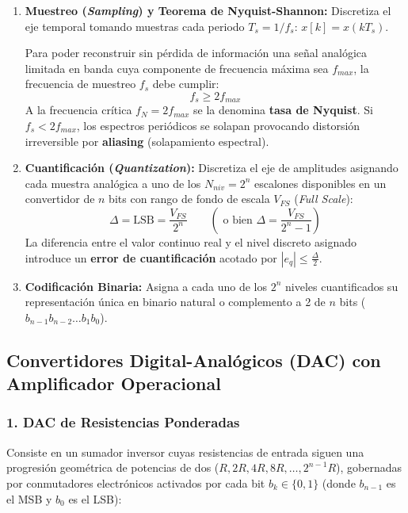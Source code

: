 \begin{enumerate}[leftmargin=*]
    \item \textbf{Muestreo (\textit{Sampling}) y Teorema de Nyquist-Shannon:}
    Discretiza el eje temporal tomando muestras cada periodo $T_s = 1/f_s$: $x[k] = x(k T_s)$.
    \begin{ley}
    Para poder reconstruir sin pérdida de información una señal analógica limitada en banda cuya componente de frecuencia máxima sea $f_{max}$, la frecuencia de muestreo $f_s$ debe cumplir:
    \begin{equation}
        \boxed{f_s \ge 2 f_{max}}
    \end{equation}
    A la frecuencia crítica $f_N = 2 f_{max}$ se la denomina \textbf{tasa de Nyquist}. Si $f_s < 2 f_{max}$, los espectros periódicos se solapan provocando distorsión irreversible por \textbf{aliasing} (solapamiento espectral).
    \end{ley}
    \item \textbf{Cuantificación (\textit{Quantization}):}
    Discretiza el eje de amplitudes asignando cada muestra analógica a uno de los $N_{niv} = 2^n$ escalones disponibles en un convertidor de $n$ bits con rango de fondo de escala $V_{FS}$ (\textit{Full Scale}):
    \begin{equation}
        \boxed{\Delta = \text{LSB} = \frac{V_{FS}}{2^n}} \qquad \left(\text{ o bien } \Delta = \frac{V_{FS}}{2^n - 1}\right)
    \end{equation}
    La diferencia entre el valor continuo real y el nivel discreto asignado introduce un \textbf{error de cuantificación} acotado por $|e_q| \le \frac{\Delta}{2}$.
    \item \textbf{Codificación Binaria:}
    Asigna a cada uno de los $2^n$ niveles cuantificados su representación única en binario natural o complemento a 2 de $n$ bits ($b_{n-1} b_{n-2} \dots b_1 b_0$).
\end{enumerate}

\subsection{Convertidores Digital-Analógicos (DAC) con Amplificador Operacional}

\subsubsection{1. DAC de Resistencias Ponderadas}
Consiste en un sumador inversor cuyas resistencias de entrada siguen una progresión geométrica de potencias de dos ($R, 2R, 4R, 8R, \dots, 2^{n-1}R$), gobernadas por conmutadores electrónicos activados por cada bit $b_k \in \{0, 1\}$ (donde $b_{n-1}$ es el MSB y $b_0$ es el LSB):

